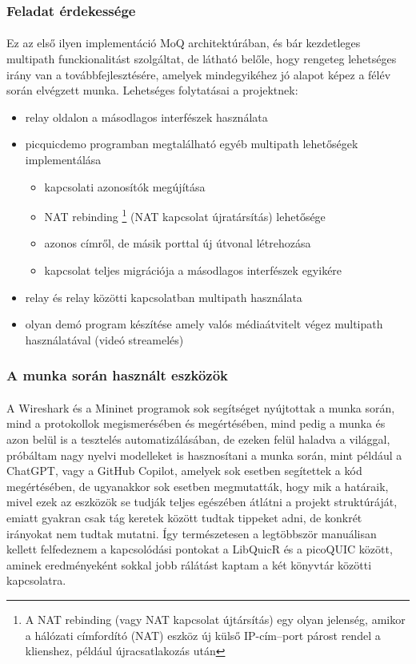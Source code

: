 \documentclass[a4paper,oneside]{article}
\begin{document}
\subsubsection{Feladat érdekessége}
\paragraph{}

Ez az első ilyen implementáció MoQ architektúrában, és bár kezdetleges multipath funckionalitást szolgáltat,
de látható belőle, hogy rengeteg lehetséges irány van a továbbfejlesztésére, amelyek mindegyikéhez jó alapot 
képez a félév során elvégzett munka. Lehetséges folytatásai a projektnek:
\begin{itemize}
  \item relay oldalon a másodlagos interfészek használata
  \item picquicdemo programban megtalálható egyéb multipath lehetőségek implementálása
  \begin{itemize}
    \item kapcsolati azonosítók megújítása
    \item NAT rebinding \footnote{A NAT rebinding (vagy NAT kapcsolat újtársítás) egy olyan jelenség, 
    amikor a hálózati címfordító (NAT) eszköz új külső IP-cím–port párost rendel a klienshez, 
    például újracsatlakozás után} (NAT kapcsolat újratársítás) lehetősége
    \item azonos címről, de másik porttal új útvonal létrehozása
    \item kapcsolat teljes migrációja a másodlagos interfészek egyikére
  \end{itemize} 
  \item relay és relay közötti kapcsolatban multipath használata
  \item olyan demó program készítése amely valós médiaátvitelt végez multipath használatával (videó streamelés)
\end{itemize}

\subsubsection{A munka során használt eszközök}
\paragraph{}
A Wireshark és a Mininet programok sok segítséget nyújtottak a munka során, mind a protokollok 
megismerésében és megértésében, mind pedig a munka és azon belül is a tesztelés automatizálásában, de ezeken 
felül haladva a világgal, próbáltam nagy nyelvi modelleket is hasznosítani a munka során, mint például a ChatGPT, vagy a GitHub Copilot,
amelyek sok esetben segítettek a kód megértésében, de ugyanakkor sok esetben megmutatták, hogy mik a határaik, mivel 
ezek az eszközök se tudják teljes egészében átlátni a projekt struktúráját, emiatt gyakran csak tág keretek között tudtak tippeket adni, de konkrét
irányokat nem tudtak mutatni. Így természetesen a legtöbbször manuálisan kellett felfedeznem a kapcsolódási pontokat a LibQuicR és a picoQUIC között,
aminek eredményeként sokkal jobb rálátást kaptam a két könyvtár közötti kapcsolatra.
\end{document}
